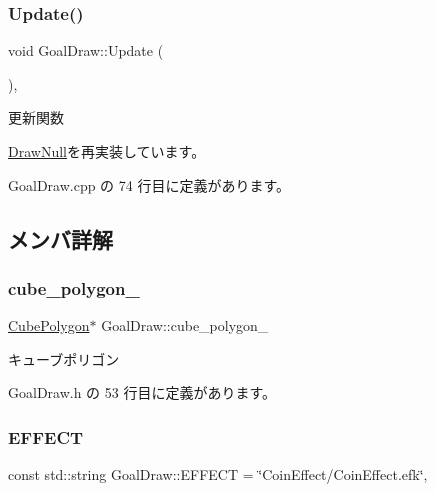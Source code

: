 \subsubsection{\texorpdfstring{Update()}{Update()}}
{\footnotesize\ttfamily void Goal\+Draw\+::\+Update (\begin{DoxyParamCaption}{ }\end{DoxyParamCaption})\hspace{0.3cm}{\ttfamily [override]}, {\ttfamily [virtual]}}



更新関数 



\mbox{\hyperlink{class_draw_null_a0149bcf84a34b138642ab7975ae46f30}{Draw\+Null}}を再実装しています。



 Goal\+Draw.\+cpp の 74 行目に定義があります。



\subsection{メンバ詳解}
\mbox{\label{class_goal_draw_add3ff2a5f7cd52a76ccfb95c27aa8a07}} 
\subsubsection{\texorpdfstring{cube\+\_\+polygon\+\_\+}{cube\_polygon\_}}
{\footnotesize\ttfamily \mbox{\hyperlink{class_cube_polygon}{Cube\+Polygon}}$\ast$ Goal\+Draw\+::cube\+\_\+polygon\+\_\+\hspace{0.3cm}{\ttfamily [private]}}



キューブポリゴン 



 Goal\+Draw.\+h の 53 行目に定義があります。

\mbox{\label{class_goal_draw_a1600b9846c344c03b4bae2919674ed90}} 
\subsubsection{\texorpdfstring{E\+F\+F\+E\+CT}{EFFECT}}
{\footnotesize\ttfamily const std\+::string Goal\+Draw\+::\+E\+F\+F\+E\+CT = \char`\"{}Coin\+Effect/Coin\+Effect.\+efk\char`\"{}\hspace{0.3cm}{\ttfamily [static]}, {\ttfamily [private]}}



